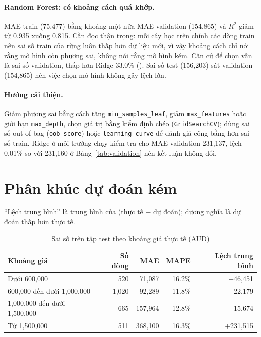 \paragraph{Random Forest: có khoảng cách quá khớp.} MAE train (75,477) bằng khoảng một nửa MAE validation (154,865) và $R^2$ giảm từ 0.935 xuống 0.815. Cần đọc thận trọng: mỗi cây học trên chính các dòng train nên sai số train của rừng luôn thấp hơn dữ liệu mới, vì vậy khoảng cách chỉ nói rằng mô hình còn phương sai, không nói rằng mô hình kém. Căn cứ để chọn vẫn là sai số validation, thấp hơn Ridge 33.0\% (). Sai số test (156,203) sát validation (154,865) nên việc chọn mô hình không gây lệch lớn.

\paragraph{Hướng cải thiện.} Giảm phương sai bằng cách tăng \texttt{min\_samples\_leaf}, giảm \texttt{max\_features} hoặc giới hạn \texttt{max\_depth}, chọn giá trị bằng kiểm định chéo (\texttt{GridSearchCV}); dùng sai số out-of-bag (\texttt{oob\_score}) hoặc \texttt{learning\_curve} để đánh giá công bằng hơn sai số train. Ridge ở môi trường chạy kiểm tra cho MAE validation 231,137, lệch 0.01\% so với 231,160 ở Bảng~\ref{tab:validation} nên kết luận không đổi.

\section{Phân khúc dự đoán kém}\label{sec:phankhuc}
``Lệch trung bình'' là trung bình của (thực tế $-$ dự đoán); dương nghĩa là dự đoán thấp hơn thực tế.

\begin{table}[H]
\centering
\caption{Sai số trên tập test theo khoảng giá thực tế (AUD)}\label{tab:saiso-gia}
\small
\begin{tabular}{@{}l r r r r@{}}
\toprule
Khoảng giá & Số dòng & MAE & MAPE & Lệch trung bình \\
\midrule
Dưới 600,000 & 520 & 71,087 & 16.2\% & $-$46,451 \\
600,000 đến dưới 1,000,000 & 1,020 & 92,289 & 11.8\% & $-$22,179 \\
1,000,000 đến dưới 1,500,000 & 665 & 157,964 & 12.8\% & $+$15,674 \\
Từ 1,500,000 & 511 & 368,100 & 16.3\% & $+$231,515 \\
\bottomrule
\end{tabular}
\end{table}

